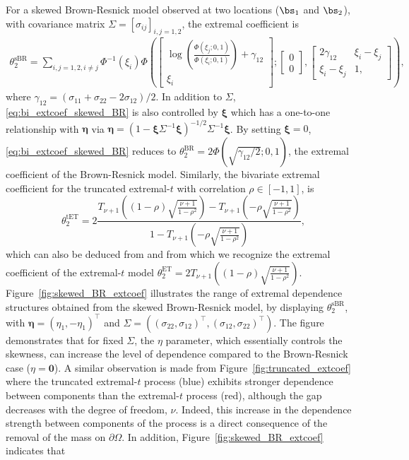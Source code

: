 \documentclass[12pt]{article}
\begin{document}
%
For a skewed Brown-Resnick model observed at two locations ($\bs_1$ and $\bs_2$), with covariance matrix $\Sigma = \left[ \sigma_{ij}\right]_{i,j=1,2}$, the extremal coefficient is 
%
\begin{align}
\label{eq:bi_extcoef_skewed_BR}
\theta_{2}^{\textrm{sBR}} = \sum_{i,j=1,2,i\neq j}\Phi^{-1}(\xi_i)
\Phi\left(
\begin{bmatrix} 
\log\left(\frac{\Phi(\xi_j;0,1)}{\Phi(\xi_i;0,1)}\right) + \gamma_{12} \\ 
\xi_i 
\end{bmatrix};
\begin{bmatrix}
0 \\ 0
\end{bmatrix},
\begin{bmatrix}
2\gamma_{12} & \xi_i - \xi_j \\ \xi_i - \xi_j & 1,
\end{bmatrix}\right), 
\end{align}
%
where $\gamma_{12} = (\sigma_{11} + \sigma_{22} -2\sigma_{12})/2$. In addition to $\Sigma$, \eqref{eq:bi_extcoef_skewed_BR} is also controlled by $\bm\xi$ which has a one-to-one relationship with $\bm\eta$ via $\bm\eta = (1-\bm \xi \Sigma^{-1} \bm\xi)^{-1/2}\Sigma^{-1}\bm\xi$.
By setting $\bm \xi = 0$, \eqref{eq:bi_extcoef_skewed_BR} reduces to $\theta_{2}^{\textrm{BR}} = 2 \Phi(\sqrt{\gamma_{12}/2}; 0, 1)$, the extremal coefficient of the Brown-Resnick model.
Similarly, the bivariate extremal coefficient for the truncated extremal-$t$ with correlation $\rho \in [-1,1]$, is
%
\begin{equation}
\label{eq:bi_extcoef_trunc_ET}
\theta_2^{\textrm{tET}} = 2 \frac{T_{\nu+1}\left( (1-\rho) \sqrt{\frac{\nu+1}{1-\rho^2}} \right) - T_{\nu+1}\left( -\rho \sqrt{\frac{\nu+1}{1-\rho^2}} \right)}{1-T_{\nu+1}\left( -\rho \sqrt{\frac{\nu+1}{1-\rho^2}} \right)},   
\end{equation}
%
which can also be deduced from \citet{Beranger.Podoan.Sisson:2021} and from which we recognize the extremal coefficient of the extremal-$t$ model $\theta_2^{\textrm{ET}} = 2 T_{\nu+1}\left( (1-\rho) \sqrt{\frac{\nu+1}{1-\rho^2}} \right)$. 
%
Figure~\ref{fig:skewed_BR_extcoef} illustrates the range of extremal dependence structures obtained from the skewed Brown-Resnick model, by displaying $\theta_2^{\textrm{sBR}}$, with $\bm\eta = (\eta_1,-\eta_1)^\top$ and $\Sigma = ((\sigma_{22},\sigma_{12})^\top,(\sigma_{12},\sigma_{22})^\top)$. The figure demonstrates that for fixed $\Sigma$, the $\eta$ parameter, which essentially controls the skewness, can increase the level of dependence compared to the Brown-Resnick case ($\eta=\bm 0$). A similar observation is made from Figure~\ref{fig:truncated_extcoef} where the truncated extremal-$t$ process (blue) exhibits stronger dependence between components than the extremal-$t$ process (red), although the gap decreases with the degree of freedom, $\nu$. Indeed, this increase in the dependence strength between components of the process is a direct consequence of the removal of the mass on $\partial\Omega$. In addition, Figure~\ref{fig:skewed_BR_extcoef} indicates that 
\end{document}
